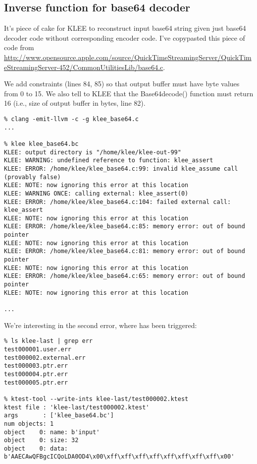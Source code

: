 \subsection{Inverse function for base64 decoder}

It's piece of cake for KLEE to reconstruct input base64 string given just base64 decoder code without corresponding encoder code.
I've copypasted this piece of code from
\url{http://www.opensource.apple.com/source/QuickTimeStreamingServer/QuickTimeStreamingServer-452/CommonUtilitiesLib/base64.c}.

We add constraints (lines 84, 85) so that output buffer must have byte values from 0 to 15.
We also tell to KLEE that the Base64decode() function must return 16 (i.e., size of output buffer in bytes, line 82).



\begin{lstlisting}
% clang -emit-llvm -c -g klee_base64.c
...

% klee klee_base64.bc
KLEE: output directory is "/home/klee/klee-out-99"
KLEE: WARNING: undefined reference to function: klee_assert
KLEE: ERROR: /home/klee/klee_base64.c:99: invalid klee_assume call (provably false)
KLEE: NOTE: now ignoring this error at this location
KLEE: WARNING ONCE: calling external: klee_assert(0)
KLEE: ERROR: /home/klee/klee_base64.c:104: failed external call: klee_assert
KLEE: NOTE: now ignoring this error at this location
KLEE: ERROR: /home/klee/klee_base64.c:85: memory error: out of bound pointer
KLEE: NOTE: now ignoring this error at this location
KLEE: ERROR: /home/klee/klee_base64.c:81: memory error: out of bound pointer
KLEE: NOTE: now ignoring this error at this location
KLEE: ERROR: /home/klee/klee_base64.c:65: memory error: out of bound pointer
KLEE: NOTE: now ignoring this error at this location

...
\end{lstlisting}

We're interesting in the second error, where  has been triggered:

\begin{lstlisting}
% ls klee-last | grep err
test000001.user.err
test000002.external.err
test000003.ptr.err
test000004.ptr.err
test000005.ptr.err

% ktest-tool --write-ints klee-last/test000002.ktest
ktest file : 'klee-last/test000002.ktest'
args       : ['klee_base64.bc']
num objects: 1
object    0: name: b'input'
object    0: size: 32
object    0: data: b'AAECAwQFBgcICQoLDA0OD4\x00\xff\xff\xff\xff\xff\xff\xff\xff\x00'
\end{lstlisting}

